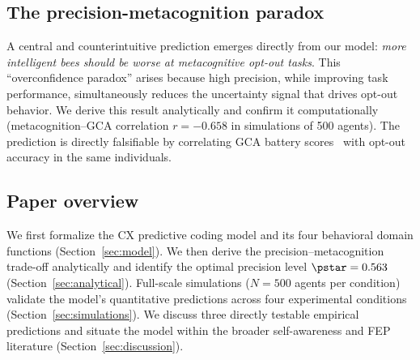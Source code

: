 \subsection*{The precision-metacognition paradox}

A central and counterintuitive prediction emerges directly from our model: \emph{more intelligent bees should be
worse at metacognitive opt-out tasks}. This ``overconfidence paradox'' arises because high precision, while
improving task performance, simultaneously reduces the uncertainty signal that drives opt-out behavior. We derive
this result analytically and confirm it computationally (metacognition--GCA correlation $r = -0.658$ in simulations
of 500 agents). The prediction is directly falsifiable by correlating GCA battery scores~\cite{AnimalCog2024} with
opt-out accuracy in the same individuals.

\subsection*{Paper overview}

We first formalize the CX predictive coding model and its four behavioral domain functions
(Section~\ref{sec:model}). We then derive the precision--metacognition trade-off analytically and identify the
optimal precision level $\pstar = 0.563$ (Section~\ref{sec:analytical}). Full-scale simulations ($N = 500$ agents
per condition) validate the model's quantitative predictions across four experimental conditions
(Section~\ref{sec:simulations}). We discuss three directly testable empirical predictions and situate the model
within the broader self-awareness and FEP literature (Section~\ref{sec:discussion}).
